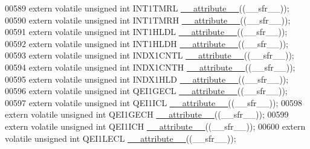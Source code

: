 \begin{DoxyCode}
00589 \textcolor{keyword}{extern} \textcolor{keyword}{volatile} \textcolor{keywordtype}{unsigned} \textcolor{keywordtype}{int}  INT1TMRL \hyperlink{a00009_a493c46f03454991ccc5aa7a6e1dfb2a7}{\_\_attribute\_\_}((\_\_sfr\_\_));
00590 \textcolor{keyword}{extern} \textcolor{keyword}{volatile} \textcolor{keywordtype}{unsigned} \textcolor{keywordtype}{int}  INT1TMRH \hyperlink{a00009_a493c46f03454991ccc5aa7a6e1dfb2a7}{\_\_attribute\_\_}((\_\_sfr\_\_));
00591 \textcolor{keyword}{extern} \textcolor{keyword}{volatile} \textcolor{keywordtype}{unsigned} \textcolor{keywordtype}{int}  INT1HLDL \hyperlink{a00009_a493c46f03454991ccc5aa7a6e1dfb2a7}{\_\_attribute\_\_}((\_\_sfr\_\_));
00592 \textcolor{keyword}{extern} \textcolor{keyword}{volatile} \textcolor{keywordtype}{unsigned} \textcolor{keywordtype}{int}  INT1HLDH \hyperlink{a00009_a493c46f03454991ccc5aa7a6e1dfb2a7}{\_\_attribute\_\_}((\_\_sfr\_\_));
00593 \textcolor{keyword}{extern} \textcolor{keyword}{volatile} \textcolor{keywordtype}{unsigned} \textcolor{keywordtype}{int}  INDX1CNTL \hyperlink{a00009_a493c46f03454991ccc5aa7a6e1dfb2a7}{\_\_attribute\_\_}((\_\_sfr\_\_));
00594 \textcolor{keyword}{extern} \textcolor{keyword}{volatile} \textcolor{keywordtype}{unsigned} \textcolor{keywordtype}{int}  INDX1CNTH \hyperlink{a00009_a493c46f03454991ccc5aa7a6e1dfb2a7}{\_\_attribute\_\_}((\_\_sfr\_\_));
00595 \textcolor{keyword}{extern} \textcolor{keyword}{volatile} \textcolor{keywordtype}{unsigned} \textcolor{keywordtype}{int}  INDX1HLD \hyperlink{a00009_a493c46f03454991ccc5aa7a6e1dfb2a7}{\_\_attribute\_\_}((\_\_sfr\_\_));
00596 \textcolor{keyword}{extern} \textcolor{keyword}{volatile} \textcolor{keywordtype}{unsigned} \textcolor{keywordtype}{int}  QEI1GECL \hyperlink{a00009_a493c46f03454991ccc5aa7a6e1dfb2a7}{\_\_attribute\_\_}((\_\_sfr\_\_));
00597 \textcolor{keyword}{extern} \textcolor{keyword}{volatile} \textcolor{keywordtype}{unsigned} \textcolor{keywordtype}{int}  QEI1ICL \hyperlink{a00009_a493c46f03454991ccc5aa7a6e1dfb2a7}{\_\_attribute\_\_}((\_\_sfr\_\_));
00598 \textcolor{keyword}{extern} \textcolor{keyword}{volatile} \textcolor{keywordtype}{unsigned} \textcolor{keywordtype}{int}  QEI1GECH \hyperlink{a00009_a493c46f03454991ccc5aa7a6e1dfb2a7}{\_\_attribute\_\_}((\_\_sfr\_\_));
00599 \textcolor{keyword}{extern} \textcolor{keyword}{volatile} \textcolor{keywordtype}{unsigned} \textcolor{keywordtype}{int}  QEI1ICH \hyperlink{a00009_a493c46f03454991ccc5aa7a6e1dfb2a7}{\_\_attribute\_\_}((\_\_sfr\_\_));
00600 \textcolor{keyword}{extern} \textcolor{keyword}{volatile} \textcolor{keywordtype}{unsigned} \textcolor{keywordtype}{int}  QEI1LECL \hyperlink{a00009_a493c46f03454991ccc5aa7a6e1dfb2a7}{\_\_attribute\_\_}((\_\_sfr\_\_));

\end{DoxyCode}
